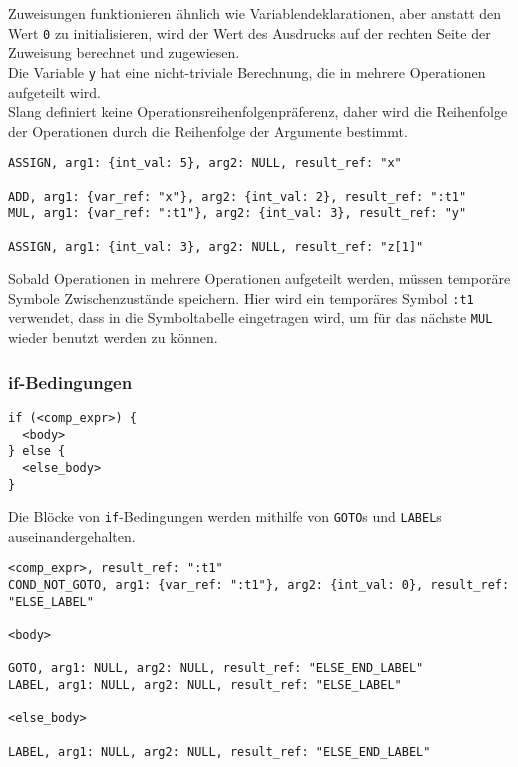 Zuweisungen funktionieren ähnlich wie Variablendeklarationen, aber anstatt den Wert \texttt{0} zu initialisieren, wird der Wert des Ausdrucks auf der rechten Seite der Zuweisung berechnet und zugewiesen.\\
Die Variable \texttt{y} hat eine nicht-triviale Berechnung, die in mehrere Operationen aufgeteilt wird.\\
Slang definiert keine Operationsreihenfolgenpräferenz, daher wird die Reihenfolge der Operationen durch die Reihenfolge der Argumente bestimmt.\\

\begin{lstlisting}[caption={Drei-Adressen Code für Zuweisungen}]
ASSIGN, arg1: {int_val: 5}, arg2: NULL, result_ref: "x"

ADD, arg1: {var_ref: "x"}, arg2: {int_val: 2}, result_ref: ":t1"
MUL, arg1: {var_ref: ":t1"}, arg2: {int_val: 3}, result_ref: "y"

ASSIGN, arg1: {int_val: 3}, arg2: NULL, result_ref: "z[1]"
\end{lstlisting}

Sobald Operationen in mehrere Operationen aufgeteilt werden, müssen temporäre Symbole Zwischenzustände speichern.
Hier wird ein temporäres Symbol \texttt{:t1} verwendet, dass in die Symboltabelle eingetragen wird, um für das nächste \texttt{MUL} wieder benutzt werden zu können.

\subsubsection{if-Bedingungen}

\begin{lstlisting}[caption={Slang Vorlage if-Bedingung}]
if (<comp_expr>) {
  <body>
} else {
  <else_body>
}
\end{lstlisting}

Die Blöcke von \texttt{if}-Bedingungen werden mithilfe von \texttt{GOTO}s und \texttt{LABEL}s auseinandergehalten.

\begin{lstlisting}[caption={Drei-Adressen Code Vorlage für if-Bedingung}]
<comp_expr>, result_ref: ":t1"
COND_NOT_GOTO, arg1: {var_ref: ":t1"}, arg2: {int_val: 0}, result_ref: "ELSE_LABEL"

<body>

GOTO, arg1: NULL, arg2: NULL, result_ref: "ELSE_END_LABEL"
LABEL, arg1: NULL, arg2: NULL, result_ref: "ELSE_LABEL"

<else_body>

LABEL, arg1: NULL, arg2: NULL, result_ref: "ELSE_END_LABEL"

\end{lstlisting}

